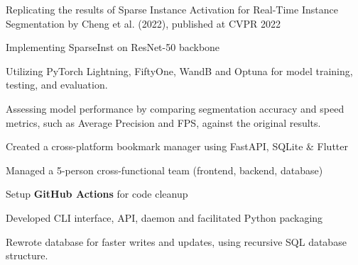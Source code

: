 \documentclass[]{resume-template}
\begin{document}
\begin{minipage}[t]{0.66\textwidth}
    \label{subsec:neatbot}
    \begin{tightemize}
        \item Replicating the results of Sparse Instance Activation for Real-Time Instance Segmentation by Cheng et al. (2022), published at CVPR 2022
        \item Implementing SparseInst on ResNet-50 backbone
        \item Utilizing PyTorch Lightning, FiftyOne, WandB and Optuna for model training, testing, and evaluation.
        \item Assessing model performance by comparing segmentation accuracy and speed metrics, such as Average Precision and FPS, against the original results.    \end{tightemize}
    \label{subsec: Bookie}
    \begin{tightemize}
        \item Created a cross-platform bookmark manager using FastAPI, SQLite \& Flutter
        \item Managed a 5-person cross-functional team (frontend, backend, database)
        \item Setup \textbf{GitHub Actions} for code cleanup
        \item Developed CLI interface, API, daemon and facilitated Python packaging
        \item Rewrote database for faster writes and updates, using recursive SQL database structure. \\
    \end{tightemize}


\end{minipage}
\end{document}
